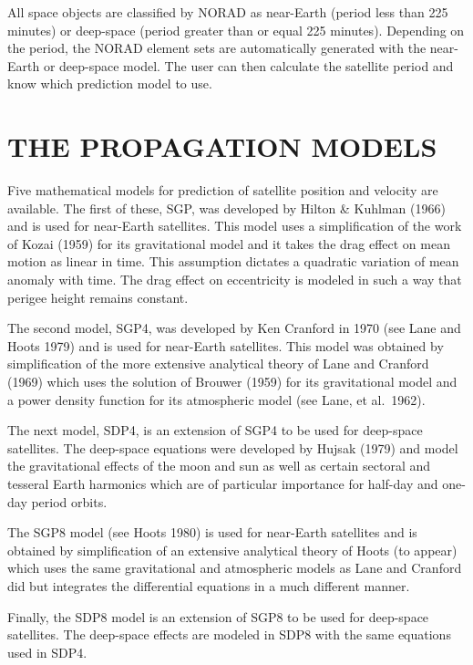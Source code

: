 All space objects are classified by NORAD as near-Earth (period less than 225
minutes) or deep-space (period greater than or equal 225 minutes).  Depending
on the period, the NORAD element sets are automatically generated with the
near-Earth or deep-space model.  The user can then calculate the satellite
period and know which prediction model to use.

\section[The Propagation Models]{THE PROPAGATION MODELS}
Five mathematical models for prediction of satellite position and velocity are
available.  The first of these, SGP, was developed by Hilton \& Kuhlman (1966)
and is used for near-Earth satellites.  This model uses a simplification of
the work of Kozai (1959) for its gravitational model and it takes the drag
effect on mean motion as linear in time.  This assumption dictates a quadratic
variation of mean anomaly with time.  The drag effect on eccentricity is
modeled in such a way that perigee height remains constant.

The second model, SGP4, was developed by Ken Cranford in 1970 (see Lane and
Hoots 1979) and is used for near-Earth satellites.  This model was obtained by
simplification of the more extensive analytical theory of Lane and Cranford
(1969) which uses the solution of Brouwer (1959) for its gravitational model
and a power density function for its atmospheric model (see Lane, et al.\
1962).

The next model, SDP4, is an extension of SGP4 to be used for deep-space
satellites.  The deep-space equations were developed by Hujsak (1979) and
model the gravitational effects of the moon and sun as well as certain
sectoral and tesseral Earth harmonics which are of particular importance for
half-day and one-day period orbits.

The SGP8 model (see Hoots 1980) is used for near-Earth satellites and is
obtained by simplification of an extensive analytical theory of Hoots (to
appear) which uses the same gravitational and atmospheric models as Lane and
Cranford did but integrates the differential equations in a much different
manner.

Finally, the SDP8 model is an extension of SGP8 to be used for deep-space
satellites.  The deep-space effects are modeled in SDP8 with the same
equations used in SDP4.


